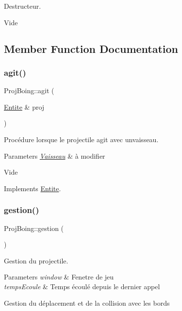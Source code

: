 Destructeur. 

Vide 

\subsection{Member Function Documentation}
\mbox{\label{class_proj_boing_acbee1a0aa00582682ce755e1b19d687a}} 
\subsubsection{\texorpdfstring{agit()}{agit()}}
{\footnotesize\ttfamily Proj\+Boing\+::agit (\begin{DoxyParamCaption}\item[{\mbox{\hyperlink{class_entite}{Entite}} \&}]{proj }\end{DoxyParamCaption})\hspace{0.3cm}{\ttfamily [virtual]}}



Procédure lorsque le projectile agit avec unvaisseau. 


\begin{DoxyParams}{Parameters}
{\em \mbox{\hyperlink{class_vaisseau}{Vaisseau}}} & à modifier\\
\hline
\end{DoxyParams}
Vide 

Implements \mbox{\hyperlink{class_entite_a848ec47afac1d7ba970a2bcab5dc7b3b}{Entite}}.

\mbox{\label{class_proj_boing_ac0d11abb68efb90dba3529d2bf1ce4f2}} 
\subsubsection{\texorpdfstring{gestion()}{gestion()}}
{\footnotesize\ttfamily Proj\+Boing\+::gestion (\begin{DoxyParamCaption}{ }\end{DoxyParamCaption})\hspace{0.3cm}{\ttfamily [virtual]}}



Gestion du projectile. 


\begin{DoxyParams}{Parameters}
{\em window} & Fenetre de jeu \\
\hline
{\em temps\+Ecoule} & Temps écoulé depuis le dernier appel\\
\hline
\end{DoxyParams}
Gestion du déplacement et de la collision avec les bords 

